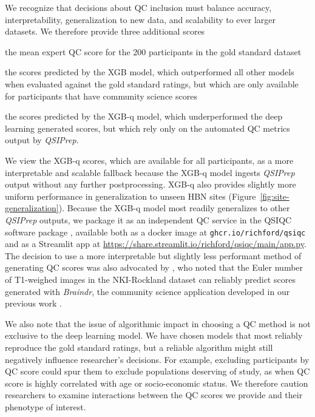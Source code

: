 \documentclass[fleqn,10pt,inline]{wlscirep}
\begin{document}
We recognize that decisions about QC inclusion must balance accuracy, interpretability, generalization to new data, and scalability to ever larger datasets. We therefore provide three additional scores
\begin{enumerate*}[%
    label=(\roman*),%
    before=\unskip{: },%
    itemjoin={{, }},%
    itemjoin*={{, and }}]
    \item the mean expert QC score for the 200 participants in the gold standard
    dataset
    \item the scores predicted by the XGB model, which outperformed all other models
    when evaluated against the gold standard ratings, but which are only available
    for participants that have community science scores
    \item the scores predicted by the XGB-q model, which underperformed the deep
    learning generated scores, but which rely only on the automated QC metrics
    output by \emph{QSIPrep}.
\end{enumerate*}
We view the XGB-q scores, which are available for all participants, as a more interpretable and scalable fallback because the XGB-q model ingests \emph{QSIPrep} output without any further postprocessing. XGB-q also provides slightly more uniform performance in generalization to unseen HBN sites (Figure~\ref{fig:site-generalization}). Because the XGB-q model most readily generalizes to other \emph{QSIPrep} outputs, we package it as an independent QC service in the QSIQC software package \cite{richiehalford2022qsiqc}, available both as a docker image at \texttt{ghcr.io/richford/qsiqc} and as a Streamlit app at \url{https://share.streamlit.io/richford/qsiqc/main/app.py}.
The decision to use a more interpretable but slightly less
performant method of generating QC scores was also advocated by
\cite{tobe2021longitudinal}, who noted that the Euler number of T1-weighed
images \cite{rosen2018quantitative} in the NKI-Rockland dataset can reliably predict scores generated with
\emph{Braindr}, the community science application developed in our previous work
\cite{keshavan2019-er}.

We also note that the issue of algorithmic impact in choosing a QC method is not
exclusive to the deep learning model. We have chosen models that most reliably
reproduce the gold standard ratings, but a reliable algorithm might still
negatively influence researcher's decisions. For example, excluding participants
by QC score could spur them to exclude populations deserving of study, as when
QC score is highly correlated with age or socio-economic status. We therefore
caution researchers to examine interactions between the QC scores we provide and
their phenotype of interest.
\end{document}
